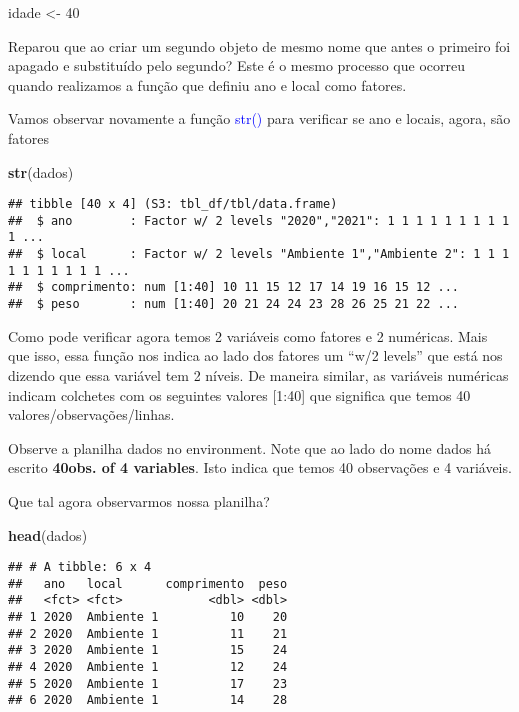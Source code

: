 \documentclass[14pt,titlepage, oneside, openany, a4paper]{book}
\newenvironment{Shaded}{\begin{snugshade}}{\end{snugshade}}
\newcommand{\DecValTok}[1]{\textcolor[rgb]{0.00,0.00,0.81}{#1}}
\newcommand{\KeywordTok}[1]{\textcolor[rgb]{0.13,0.29,0.53}{\textbf{#1}}}
\newcommand{\NormalTok}[1]{#1}
\newcommand{\StringTok}[1]{\textcolor[rgb]{0.31,0.60,0.02}{#1}}
\begin{document}
\begin{Shaded}
\begin{Highlighting}[]
\NormalTok{idade <-}\StringTok{ }\DecValTok{40}
\end{Highlighting}
\end{Shaded}

Reparou que ao criar um segundo objeto de mesmo nome que antes o primeiro foi apagado e substituído pelo segundo? Este é o mesmo processo que ocorreu quando realizamos a função que definiu ano e local como fatores.

Vamos observar novamente a função \textcolor{blue}{str()} para verificar se ano e locais, agora, são fatores

\begin{Shaded}
\begin{Highlighting}[]
\KeywordTok{str}\NormalTok{(dados)}
\end{Highlighting}
\end{Shaded}

\begin{verbatim}
## tibble [40 x 4] (S3: tbl_df/tbl/data.frame)
##  $ ano        : Factor w/ 2 levels "2020","2021": 1 1 1 1 1 1 1 1 1 1 ...
##  $ local      : Factor w/ 2 levels "Ambiente 1","Ambiente 2": 1 1 1 1 1 1 1 1 1 1 ...
##  $ comprimento: num [1:40] 10 11 15 12 17 14 19 16 15 12 ...
##  $ peso       : num [1:40] 20 21 24 24 23 28 26 25 21 22 ...
\end{verbatim}

Como pode verificar agora temos 2 variáveis como fatores e 2 numéricas. Mais que isso, essa função nos indica ao lado dos fatores um ``w/2 levels'' que está nos dizendo que essa variável tem 2 níveis. De maneira similar, as variáveis numéricas indicam colchetes com os seguintes valores {[}1:40{]} que significa que temos 40 valores/observações/linhas.

Observe a planilha dados no environment. Note que ao lado do nome dados há escrito \textbf{40obs. of 4 variables}. Isto indica que temos 40 observações e 4 variáveis.

Que tal agora observarmos nossa planilha?

\begin{Shaded}
\begin{Highlighting}[]
\KeywordTok{head}\NormalTok{(dados)}
\end{Highlighting}
\end{Shaded}

\begin{verbatim}
## # A tibble: 6 x 4
##   ano   local      comprimento  peso
##   <fct> <fct>            <dbl> <dbl>
## 1 2020  Ambiente 1          10    20
## 2 2020  Ambiente 1          11    21
## 3 2020  Ambiente 1          15    24
## 4 2020  Ambiente 1          12    24
## 5 2020  Ambiente 1          17    23
## 6 2020  Ambiente 1          14    28
\end{verbatim}
\end{document}

